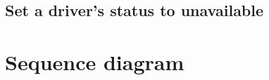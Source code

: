 \subsection{Set a driver’s status to unavailable}
\begin{figure}[H]
\centering
{}
\end{figure}


\section{Sequence diagram}
\begin{landscape}
%
\end{landscape}


